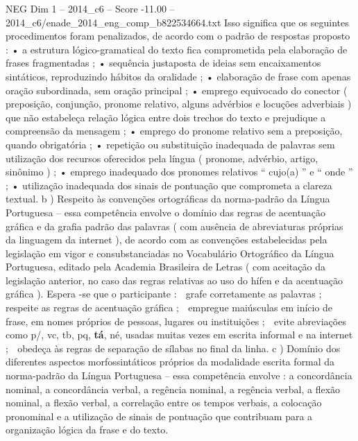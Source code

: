 \begin{textsample}{NEG Dim 1 – 2014\_c6 – Score -11.00 – 2014\_c6/enade\_2014\_eng\_comp\_b822534664.txt}
Isso significa que os seguintes procedimentos foram penalizados, de acordo com o padrão de respostas proposto : • a estrutura lógico-gramatical do texto fica comprometida pela elaboração de frases fragmentadas ; • sequência justaposta de ideias sem encaixamentos sintáticos, reproduzindo hábitos da oralidade ; • elaboração de frase com apenas oração subordinada, sem oração principal ; • emprego equivocado do conector ( preposição, conjunção, pronome relativo, alguns advérbios e locuções adverbiais ) que não estabeleça relação lógica entre dois trechos do texto e prejudique a compreensão da mensagem ; • emprego do pronome relativo sem a preposição, quando obrigatória ; • repetição ou substituição inadequada de palavras sem utilização dos recursos oferecidos pela língua ( pronome, advérbio, artigo, sinônimo ) ; • emprego inadequado dos pronomes relativos “ cujo(a) ” e “ onde ” ; • utilização inadequada dos sinais de pontuação que comprometa a clareza textual. b ) Respeito às convenções ortográficas da norma-padrão da Língua Portuguesa – essa competência envolve o domínio das regras de acentuação gráfica e da grafia padrão das palavras ( com ausência de abreviaturas próprias da linguagem da internet ), de acordo com as convenções estabelecidas pela legislação em vigor e consubstanciadas no Vocabulário Ortográfico da Língua Portuguesa, editado pela Academia Brasileira de Letras ( com aceitação da legislação anterior, no caso das regras relativas ao uso do hífen e da acentuação gráfica ).
Espera -se que o participante :  grafe corretamente as palavras ;  respeite as regras de acentuação gráfica ;  empregue maiúsculas em início de frase, em nomes próprios de pessoas, lugares ou instituições ;  evite abreviações como p/, vc, tb, pq, \textbf{tá}, né, usadas muitas vezes em escrita informal e na internet ;  obedeça às regras de separação de sílabas no final da linha. c ) Domínio dos diferentes aspectos morfossintáticos próprios da modalidade escrita formal da norma-padrão da Língua Portuguesa – essa competência envolve : a concordância nominal, a concordância verbal, a regência nominal, a regência verbal, a flexão nominal, a flexão verbal, a correlação entre os tempos verbais, a colocação pronominal e a utilização de sinais de pontuação que contribuam para a organização lógica da frase e do texto.

\end{textsample}

